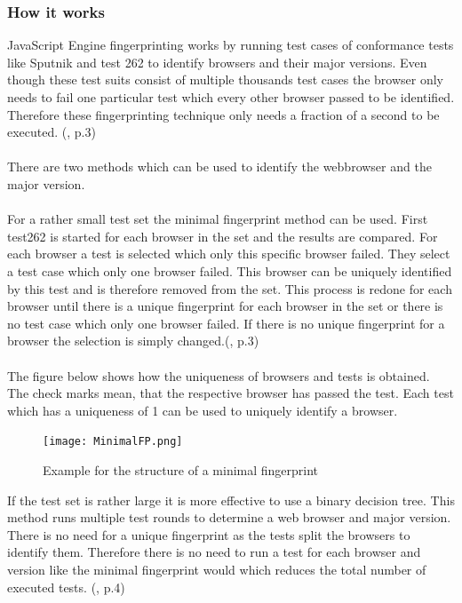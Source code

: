 \subsubsection{How it works}
JavaScript Engine fingerprinting works by running test cases of conformance tests like Sputnik and test 262 to identify browsers and their major versions. Even though these test suits consist of multiple thousands test cases the browser only needs to fail one particular test which every other browser passed to be identified. Therefore these fingerprinting technique only needs a fraction of a second to be executed. (\textcite{mulazzani13}, p.3) \\\\
There are two methods which can be used to identify the webbrowser and the major version.\\\\
For a rather small test set the minimal fingerprint method can be used. First test262 is started for each browser in the set and the results are compared. For each browser a test is selected which only this specific browser failed. They select a test case which only one browser failed. This browser can be uniquely identified by this test and is therefore removed from the set. This process is redone for each browser until there is a unique fingerprint for each browser in the set or there is no test case which only one browser failed. If there is no unique fingerprint for a browser the selection is simply changed.(\textcite{mulazzani13}, p.3)\\\\
The figure below shows how the uniqueness of browsers and tests is obtained. The check marks mean, that the respective browser has passed the test. Each test which has a uniqueness of 1 can be used to uniquely identify a browser.
\begin{figure}[H]
	\centering
	\texttt{[image: MinimalFP.png]}
	\caption{Example for the structure of a minimal fingerprint\\}
	\label{MinimalFP}
\end{figure}
If the test set is rather large it is more effective to use a binary decision tree. This method runs multiple test rounds to determine a web browser and major version. There is no need for a unique fingerprint as the tests split the browsers to identify them. Therefore there is no need to run a test for each browser and version like the  minimal fingerprint would which reduces the total number of executed tests. (\textcite{mulazzani13}, p.4)\\\\
